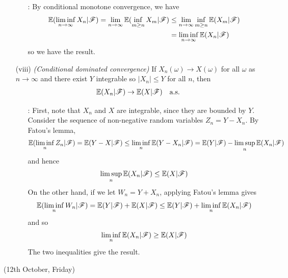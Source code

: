 \documentclass[12pt,a4paper]{report}
\begin{document}
\begin{itemize}
\begin{itemize}
\item[:] By conditional monotone convergence, we have
\begin{align*}
\mathbb{E}(\liminf_{n\rightarrow \infty} X_n |\mathscr{F}) = \lim_{n\rightarrow \infty} \mathbb{E}(\inf_{m\geq n} X_m |\mathscr{F}) &\leq \lim_{n\rightarrow \infty} \inf_{m\geq n} \mathbb{E}(X_m | \mathscr{F}) \\
&= \liminf_{n\rightarrow \infty} \mathbb{E}(X_n | \mathscr{F})
\end{align*}
so we have the result.
\end{itemize}
\item[(viii)] \emph{(Conditional dominated convergence)} If $X_n(\omega) \rightarrow X(\omega)$ for all $\omega$ as $n\rightarrow \infty$ and there exist $Y$ integrable so $|X_n| \leq Y$ for all $n$, then 
\begin{align*}
\mathbb{E}(X_n|\mathscr{F}) \rightarrow \mathbb{E}(X|\mathscr{F}) \quad \text{a.s.}
\end{align*}
\begin{itemize}
\item[:] First, note that $X_n$ and $X$ are integrable, since they are bounded by $Y$. Consider the sequence of non-negative random variables $Z_n = Y-X_n$. By Fatou's lemma,
\begin{align*}
\mathbb{E}(\liminf_{n} Z_n |\mathscr{F}) = \mathbb{E}(Y-X|\mathscr{F}) \leq \liminf_{n} \mathbb{E}(Y-X_n|\mathscr{F}) = \mathbb{E}(Y|\mathscr{F}) - \limsup_{n} \mathbb{E}(X_n|\mathscr{F})
\end{align*}
and hence
\begin{align*}
\limsup_{n} \mathbb{E}(X_n|\mathscr{F}) \leq \mathbb{E}(X|\mathscr{F})
\end{align*}
On the other hand, if we let $W_n = Y+X_n$, applying Fatou's lemma gives
\begin{align*}
\mathbb{E}(\liminf_n W_n |\mathscr{F}) = \mathbb{E}(Y|\mathscr{F}) + \mathbb{E}(X|\mathscr{F}) \leq \mathbb{E}(Y|\mathscr{F}) + \liminf_{n} \mathbb{E}(X_n|\mathscr{F})
\end{align*}
and so
\begin{align*}
\liminf_n \mathbb{E}(X_n|\mathscr{F}) \geq \mathbb{E}(X|\mathscr{F})
\end{align*}
The two inequalities give the result.
\end{itemize}
\end{itemize}

\newday

(12th October, Friday)
\s
\end{document}
